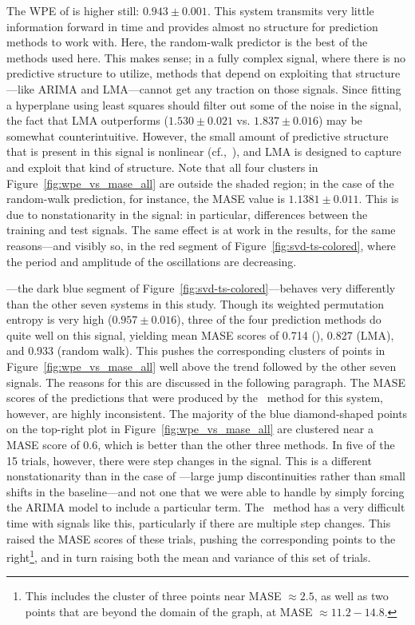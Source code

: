 The WPE of \gcc is higher still: $0.943 \pm 0.001$.  This system
transmits very little information forward in time and provides almost
no structure for prediction methods to work with.  Here, the
random-walk predictor is the best of the methods used here.  This
makes sense; in a fully complex signal, where there is no predictive
structure to utilize, methods that depend on exploiting that
structure---like ARIMA and LMA---cannot get any traction on those
signals.
%
%
Since fitting a hyperplane using least squares should filter out some
of the noise in the signal, the fact that LMA outperforms \arima
($1.530 \pm 0.021$ vs. $1.837 \pm 0.016$) may be somewhat
counterintuitive.  However, the small amount of predictive structure
that is present in this signal is nonlinear (cf.,~\cite{mytkowicz09}),
and LMA is designed to capture and exploit that kind of structure.
Note that all four \gcc clusters in Figure~\ref{fig:wpe_vs_mase_all}
are outside the shaded region; in the case of the random-walk
prediction, for instance, the MASE value is $1.1381 \pm 0.011$.  This
is due to nonstationarity in the signal: in particular, differences
between the training and test signals.  The same effect is at work in
the \svdtwo results, for the same reasons---and visibly so, in the red
segment of Figure~\ref{fig:svd-ts-colored}, where the period and
amplitude of the oscillations are decreasing.

\svdone---the dark blue segment of
Figure~\ref{fig:svd-ts-colored}---behaves very differently than the
other seven systems in this study.  Though its weighted permutation
entropy is very high ($0.957 \pm 0.016$), three of the four prediction
methods do quite well on this signal, yielding mean MASE scores of
0.714 (\arima), 0.827 (LMA), and 0.933 (random walk).  This pushes the
corresponding clusters of points in Figure~\ref{fig:wpe_vs_mase_all}
well above the trend followed by the other seven signals.  The reasons
for this are discussed in the following paragraph.  The MASE scores of
the predictions that were produced by the \naive ~method for this
system, however, are highly inconsistent.  The majority of the blue
diamond-shaped points on the top-right plot in
Figure~\ref{fig:wpe_vs_mase_all} are clustered near a MASE score of
0.6, which is better than the other three methods.  In five of the 15
\svdone trials, however, there were step changes in the signal.  This
is a different nonstationarity than in the case of \col---large jump
discontinuities rather than small shifts in the baseline---and not one
that we were able to handle by simply forcing the ARIMA model to
include a particular term.  The \naive ~method has a very difficult
time with signals like this, particularly if there are multiple step
changes.  This raised the MASE scores of these trials, pushing the
corresponding points to the right\footnote{This includes the cluster
  of three points near MASE $\approx 2.5$, as well as two points that
  are beyond the domain of the graph, at MASE $\approx 11.2-14.8$.},
and in turn raising both the mean and variance of this set of trials.

